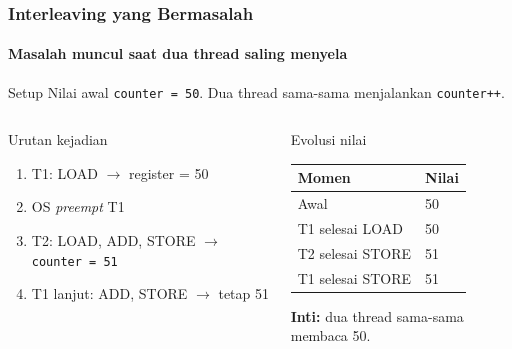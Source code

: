 \documentclass[t,aspectratio=169,xcolor=dvipsnames]{beamer}
\begin{document}
\begin{frame}
    \frametitle{Interleaving yang Bermasalah}
    \framesubtitle{Masalah muncul saat dua thread saling menyela}
    \footnotesize

    \begin{block}{Setup}
        Nilai awal \texttt{counter = 50}. Dua thread sama-sama menjalankan \texttt{counter++}.
    \end{block}

    \vspace{0.15cm}
    \begin{columns}[T]
        \begin{block}{Urutan kejadian}
            \begin{enumerate}
                \item T1: LOAD $\rightarrow$ register = 50
                \item OS \textit{preempt} T1
                \item T2: LOAD, ADD, STORE $\rightarrow$ \texttt{counter = 51}
                \item T1 lanjut: ADD, STORE $\rightarrow$ tetap 51
            \end{enumerate}
        \end{block}

        \begin{block}{Evolusi nilai}
            \scriptsize
            \begin{tabular}{p{}p{}}
                \toprule
                \textbf{Momen} & \textbf{Nilai} \\
                \midrule
                Awal & 50 \\
                T1 selesai LOAD & 50 \\
                T2 selesai STORE & 51 \\
                T1 selesai STORE & 51 \\
                \bottomrule
            \end{tabular}

            \vspace{0.1cm}
            \textbf{Inti:} dua thread sama-sama membaca 50.
        \end{block}
    \end{columns}
\end{frame}
\end{document}
